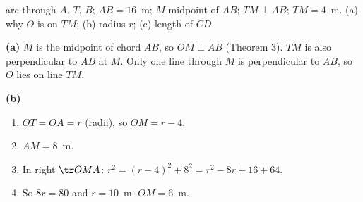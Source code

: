 
\begin{answerblock}
\begin{minipage}[t]{0.66\linewidth}\vspace{0pt}
\Given arc through $A$, $T$, $B$; $AB=16$~m; $M$ midpoint of $AB$; $TM\perp AB$; $TM=4$~m. \Tofind (a) why $O$ is on $TM$; (b) radius $r$; (c) length of $CD$.

\textbf{(a)} $M$ is the midpoint of chord $AB$, so $OM\perp AB$ (Theorem 3). $TM$ is also perpendicular to $AB$ at $M$. Only one line through $M$ is perpendicular to $AB$, so $O$ lies on line $TM$.

\textbf{(b)}
\begin{enumerate}[label=\arabic*.,leftmargin=1.6em,itemsep=0pt,topsep=2pt]
\item $OT=OA=r$ (radii), so $OM=r-4$.
\item $AM=8$~m.
\item In right $\tr OMA$: $r^2=(r-4)^2+8^2=r^2-8r+16+64$.
\item So $8r=80$ and $r=10$~m. $OM=6$~m.
\end{enumerate}


\end{minipage}
\end{answerblock}
